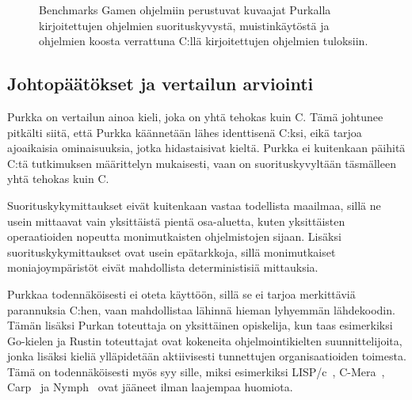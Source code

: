\begin{figure}[ht!]
    \begin{adjustbox}{center}
        \begin{minipage}{1.25\textwidth}
        
        \end{minipage}
    \end{adjustbox}

    \begin{adjustbox}{center}
        \begin{minipage}{1.25\textwidth}
        
        \end{minipage}
    \end{adjustbox}

    \begin{adjustbox}{center}
        \begin{minipage}{1.25\textwidth}
        
        \end{minipage}
    \end{adjustbox}
    \caption{
        Benchmarks Gamen ohjelmiin perustuvat kuvaajat Purkalla kirjoitettujen ohjelmien
        suorituskyvystä, muistinkäytöstä ja ohjelmien koosta verrattuna C:llä
        kirjoitettujen ohjelmien tuloksiin.}
    \label{fig:purkkabenchmarksgame}
\end{figure}

\FloatBarrier

\subsection{Johtopäätökset ja vertailun arviointi}

Purkka on vertailun ainoa kieli, joka on yhtä tehokas kuin C. Tämä johtunee
pitkälti siitä, että Purkka käännetään lähes identtisenä C:ksi, eikä tarjoa
ajoaikaisia ominaisuuksia, jotka hidastaisivat kieltä. Purkka ei kuitenkaan
päihitä C:tä tutkimuksen määrittelyn mukaisesti, vaan on suorituskyvyltään
täsmälleen yhtä tehokas kuin C.

Suorituskykymittaukset eivät kuitenkaan vastaa todellista maailmaa, sillä ne
usein mittaavat vain yksittäistä pientä osa-aluetta, kuten yksittäisten
operaatioiden nopeutta monimutkaisten ohjelmistojen sijaan. Lisäksi
suorituskykymittaukset ovat usein epätarkkoja, sillä monimutkaiset
moniajoympäristöt eivät mahdollista deterministisiä mittauksia.

Purkkaa todennäköisesti ei oteta käyttöön, sillä se ei tarjoa merkittäviä
parannuksia C:hen, vaan mahdollistaa lähinnä hieman lyhyemmän lähdekoodin.
Tämän lisäksi Purkan toteuttaja on yksittäinen opiskelija, kun taas esimerkiksi
Go-kielen ja Rustin toteuttajat ovat kokeneita ohjelmointikielten
suunnittelijoita, jonka lisäksi kieliä ylläpidetään aktiivisesti tunnettujen
organisaatioiden toimesta. Tämä on todennäköisesti myös syy sille, miksi
esimerkiksi LISP/c~\citep{clisp1}, C-Mera~\citep{clisp2}, Carp~\citep{clisp3}
ja Nymph~\citep{nymph} ovat jääneet ilman laajempaa huomiota.

